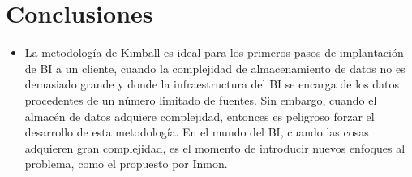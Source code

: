 \documentclass[%
 reprint,
 amsmath,amssymb,
 aps,
]{revtex4-1}
\begin{document}
\section{Conclusiones}

\begin{itemize}
\item La metodología de Kimball es ideal para los primeros pasos de implantación de BI a un cliente, cuando la complejidad de almacenamiento de datos no es demasiado grande y donde la infraestructura del BI se encarga de los datos procedentes de un número limitado de fuentes. Sin embargo, cuando el almacén de datos adquiere complejidad, entonces es peligroso forzar el desarrollo de esta metodología. En el mundo del BI, cuando las cosas adquieren gran complejidad, es el momento de introducir nuevos enfoques al problema, como el propuesto por Inmon.

\end{itemize}





\end{document}
